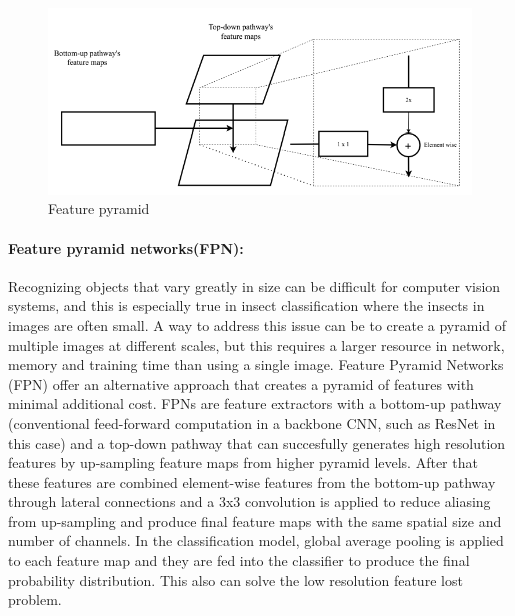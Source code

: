 \begin{figure}[htb]
    \centering
    \includegraphics[scale=.5]{figures/featuremap.png}
    \caption{Feature pyramid \cite{ung2021efficient}}
    \label{fig:fpn2}
\end{figure}

\paragraph{Feature pyramid networks(FPN):}
Recognizing objects that vary greatly in size can be difficult for computer vision systems, and this is especially true in insect classification where the insects in images are often small. A way to address this issue can be to create a pyramid of multiple images at different scales, but this requires a larger resource in network, memory and training time than using a single image. Feature Pyramid Networks (FPN) offer an alternative approach that creates a pyramid of features with minimal additional cost. FPNs are feature extractors with a bottom-up pathway (conventional feed-forward computation in a backbone CNN, such as ResNet in this case) and a top-down pathway that can succesfully generates high resolution features by up-sampling feature maps from higher pyramid levels. After that these features are combined element-wise features from the bottom-up pathway through lateral connections and a 3x3 convolution is applied to reduce aliasing from up-sampling and produce final feature maps with the same spatial size and number of channels. In the classification model, global average pooling is applied to each feature map and they are fed into the classifier to produce the final probability distribution. This also can solve the low resolution feature lost problem.

